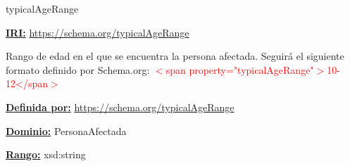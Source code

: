 \begin{mybox}{typicalAgeRange}
\begin{flushleft}
\underline{\textbf{IRI:}}
\url{https://schema.org/typicalAgeRange}
\newline

Rango de edad en el que se encuentra la persona afectada.
\newline Seguirá el siguiente formato definido por Schema.org: 
\newline  \textcolor{red}{ $<$span property="typicalAgeRange"$>$10-12</span$>$ } \cite{schema_typicalAgeRange}
\newline

\underline{\textbf{Definida por:}}
\url{https://schema.org/typicalAgeRange}
\newline

\underline{\textbf{Dominio:}} 
\newline PersonaAfectada
\newline

\underline{\textbf{Rango:}}
\newline xsd:string
\newline

\end{flushleft}
\end{mybox}



































